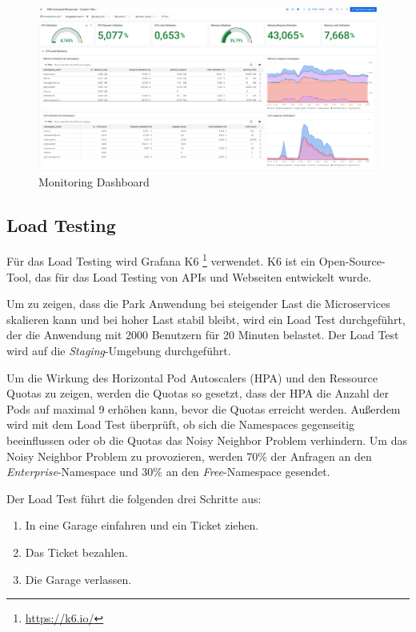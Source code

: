 \begin{figure}[H]
  \centering
  \includegraphics[width=\textwidth]{resources/Monitoring.png}
  \caption{Monitoring Dashboard}
  \label{fig:monitoring-dashboard}
\end{figure}

\subsection{Load Testing}

Für das Load Testing wird Grafana K6 \footnote{\url{https://k6.io/}} verwendet. K6 ist ein Open-Source-Tool,
das für das Load Testing von APIs und Webseiten entwickelt wurde.

Um zu zeigen, dass die Park Anwendung bei steigender Last die Microservices skalieren kann und bei hoher 
Last stabil bleibt, wird ein Load Test durchgeführt, der die Anwendung mit 2000 Benutzern für 20 Minuten belastet.
Der Load Test wird auf die \textit{Staging}-Umgebung durchgeführt. 

Um die Wirkung des Horizontal Pod Autoscalers (HPA) und den Ressource Quotas zu zeigen, werden die Quotas so gesetzt,
dass der HPA die Anzahl der Pods auf maximal 9 erhöhen kann, bevor die Quotas erreicht werden. Außerdem wird mit 
dem Load Test überprüft, ob sich die Namespaces gegenseitig beeinflussen oder ob die Quotas das Noisy Neighbor Problem verhindern.
Um das Noisy Neighbor Problem zu provozieren, werden 70\% der Anfragen an den 
\textit{Enterprise}-Namespace und 30\% an den \textit{Free}-Namespace gesendet.

Der Load Test führt die folgenden drei Schritte aus:
\begin{enumerate}
  \item In eine Garage einfahren und ein Ticket ziehen.
  \item Das Ticket bezahlen.
  \item Die Garage verlassen.
\end{enumerate}


